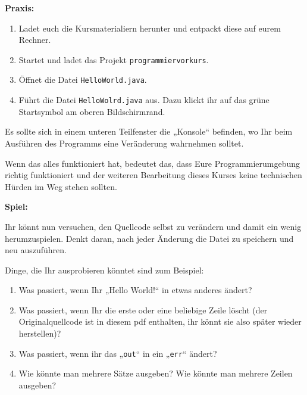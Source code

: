 \textbf{Praxis:}
\begin{enumerate}
  \item Ladet euch die Kursmaterialiern herunter und entpackt diese auf eurem Rechner.
	\item Startet \Eclipse und ladet das Projekt \texttt{programmiervorkurs}.
  \item Öffnet die Datei \texttt{HelloWorld.java}. 
  \item Führt die Datei \texttt{HelloWolrd.java} aus. Dazu klickt ihr auf das
    grüne Startsymbol am oberen Bildschirmrand.
\end{enumerate}

Es sollte sich in einem unteren Teilfenster die „Konsole“ befinden, wo Ihr beim
Ausführen des Programms eine Veränderung wahrnehmen solltet. 


Wenn das alles funktioniert hat, bedeutet das, dass Eure Programmierumgebung
richtig funktioniert und der weiteren Bearbeitung dieses Kurses keine
technischen Hürden im Weg stehen sollten.

\textbf{Spiel:}

Ihr könnt nun versuchen, den Quellcode selbst zu verändern und damit ein wenig
herumzuspielen. Denkt daran, nach jeder Änderung die Datei zu speichern und neu
auszuführen.

Dinge, die Ihr ausprobieren könntet sind zum Beispiel:
\begin{enumerate}
\item Was passiert, wenn Ihr „Hello World!“ in etwas anderes ändert?
\item Was passiert, wenn Ihr die erste oder eine beliebige Zeile löscht (der
  Originalquellcode ist in diesem pdf enthalten, ihr könnt sie also später
  wieder herstellen)?
\item Was passiert, wenn ihr das „\verb|out|“ in ein „\verb|err|“ ändert?
\item Wie könnte man mehrere Sätze ausgeben? Wie könnte man mehrere Zeilen
  ausgeben?
\end{enumerate}
